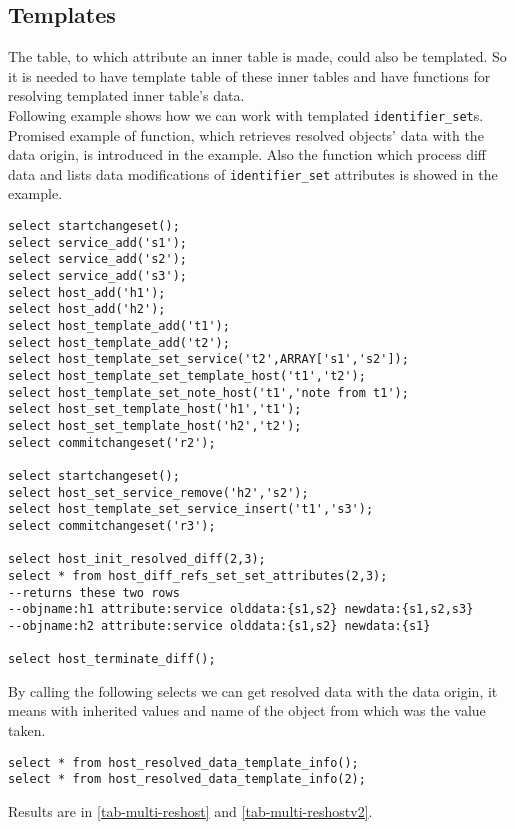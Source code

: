 \documentclass[deska]{subfiles}
\begin{document}
\subsection{Templates}
The table, to which attribute an inner table is made, could also be templated. So it is needed to have template table of these inner tables and have functions for resolving templated inner table's data.\\
Following example shows how we can work with templated {\tt identifier\_set}s. Promised example of function, which retrieves resolved objects' data with the data origin, is introduced in the example. Also the function which process diff data and lists data modifications of {\tt identifier\_set} attributes is showed in the example.\\

\begin{verbatim}
select startchangeset();
select service_add('s1');
select service_add('s2');
select service_add('s3');
select host_add('h1');
select host_add('h2');
select host_template_add('t1');
select host_template_add('t2');
select host_template_set_service('t2',ARRAY['s1','s2']);
select host_template_set_template_host('t1','t2');
select host_template_set_note_host('t1','note from t1');
select host_set_template_host('h1','t1');
select host_set_template_host('h2','t2');
select commitchangeset('r2');

select startchangeset();
select host_set_service_remove('h2','s2');
select host_template_set_service_insert('t1','s3');
select commitchangeset('r3');

select host_init_resolved_diff(2,3);
select * from host_diff_refs_set_set_attributes(2,3);
--returns these two rows
--objname:h1 attribute:service olddata:{s1,s2} newdata:{s1,s2,s3}
--objname:h2 attribute:service olddata:{s1,s2} newdata:{s1}

select host_terminate_diff();
\end{verbatim}

By calling the following selects we can get resolved data with the data origin, it means with inherited values and name of the object from which was the value taken.\\
\begin{verbatim}
select * from host_resolved_data_template_info();
select * from host_resolved_data_template_info(2);
\end{verbatim}

Results are in \ref{tab-multi-reshost} and \ref{tab-multi-reshostv2}.
\end{document}
